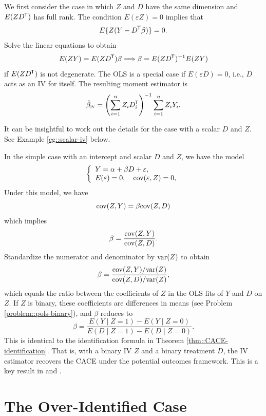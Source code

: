 We first consider the case in which $Z$ and $D$ have the same dimension and $E(ZD^{\mkern-1.5mu\mathsf{T}})$ has full rank. The condition $E(\varepsilon Z) = 0$ implies that
$$
E\{  Z (Y -  D ^{\mkern-1.5mu\mathsf{T}} \beta) \} = 0 .
$$
Solve the linear equations to obtain
$$
E(  ZY)  = E(ZD^{\mkern-1.5mu\mathsf{T}}) \beta  \\
 \Longrightarrow 
\beta = E(ZD^{\mkern-1.5mu\mathsf{T}}) ^{-1} E(  ZY)  
$$
if $E(ZD^{\mkern-1.5mu\mathsf{T}})$ is not degenerate. 
The OLS is a special case if $E(\varepsilon D) = 0$, i.e., $D$ acts as an IV for itself. The resulting moment estimator is
\begin{eqnarray}\label{eq::iv-estimator}
\hat{\beta}_\textsc{iv} = \left(  \sumn Z_i D_i\tran \right)^{-1}  \sumn Z_iY_i.
\end{eqnarray}

It can be insightful to work out the details for the case with a  scalar $D$ and $Z$. See Example \ref{eg::scalar-iv} below.

\begin{example}\label{eg::scalar-iv}
In the simple case with an intercept and scalar $D$ and $Z$, we have  the model
$$
\left\{ \begin{array}{l}
Y = \alpha +  \beta  D + \varepsilon ,\\
E(\varepsilon) = 0, \quad \textup{cov}(\varepsilon, Z) = 0,
\end{array}
\right.
$$
Under this model, we have 
$$
\textup{cov}( Z, Y ) = \beta \textup{cov}(Z, D) 
$$
which implies
$$
 \beta = \frac{ \textup{cov}( Z, Y )   }{ \textup{cov}(Z, D) }.
$$
Standardize the numerator and denominator by $\textup{var}(Z)$ to obtain 
$$
\beta =  \frac{ \textup{cov}( Z, Y ) / \textup{var}(Z)  }{ \textup{cov}(Z, D) / \textup{var}(Z) },
$$
which equals the ratio between the coefficients of $Z$ in the OLS fits of $Y$ and $D$ on $Z$. 
If $Z$ is binary, these coefficients are differences in means (see Problem \ref{problem::pols-binary}), and $\beta$ reduces to
$$
\beta = \frac{ E(Y\mid Z=1) - E(Y\mid Z=0)  }{ E(D\mid Z=1) - E(D\mid Z=0) } .
$$
This is identical to the identification formula in Theorem \ref{thm::CACE-identification}. That is, with a binary IV $Z$ and a binary treatment $D$, the IV estimator recovers the CACE under the potential outcomes framework. This is a key result in  \citet{imbens1994identification} and \citet{angrist1996identification}.  
\end{example}



 

\section{The Over-Identified Case}
\label{sec::sec::iv-over-identify}


